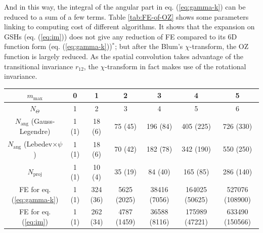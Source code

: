 And in this way, the integral of the angular part in eq. (\ref{eq:gamma-k})
can be reduced to a sum of a few terms. Table \ref{tab:FE-of-OZ}
shows some parameters linking to computing cost of different algorithms.
It
shows that the expansion on \acs{GSH}s (eq. (\ref{eq:im})) does
not give any reduction of \acs{FE} compared to its 6D function form
(eq. (\ref{eq:gamma-k}))$^{*}$; but after the Blum's $\chi$-transform,
the \acs{OZ} function is largely reduced. As the spatial convolution
takes advantage of the transitional invariance $r_{12}$, the $\chi$-transform
in fact makes use of the rotational invariance.

\begin{table}[h]
\centering{}\hspace{-4em}%
\noindent\begin{minipage}[t]{1.1\columnwidth}%
\begin{center}
\begin{tabular*}{1\textwidth}{@{\extracolsep{\fill}}ccccccc}
\toprule 
{\footnotesize{}$m_{\mathrm{max}}$} & {\footnotesize{}0} & {\footnotesize{}1} & {\footnotesize{}2} & {\footnotesize{}3} & {\footnotesize{}4} & {\footnotesize{}5}\tabularnewline
\midrule
{\footnotesize{}$N_{\Theta}$} & {\footnotesize{}1} & {\footnotesize{}2} & {\footnotesize{}3} & {\footnotesize{}4} & {\footnotesize{}5} & {\footnotesize{}6}\tabularnewline
{\footnotesize{}$N_{\mathrm{ang}}$ (Gauss-Legendre)} & {\footnotesize{}1 (1)} & {\footnotesize{}18 (6)} & {\footnotesize{}75 (45)} & {\footnotesize{}196 (84)} & {\footnotesize{}405 (225)} & {\footnotesize{}726 (330)}\tabularnewline
{\footnotesize{}$N_{\mathrm{ang}}$ (Lebedev$\times\psi$)} & {\footnotesize{}1 (1)} & {\footnotesize{}18 (6)} & {\footnotesize{}70 (42)} & {\footnotesize{}182 (78)} & {\footnotesize{}342 (190)} & {\footnotesize{}550 (250)}\tabularnewline
{\footnotesize{}$N_{\mathrm{proj}}$ } & {\footnotesize{}1 (1)} & {\footnotesize{}10 (4)} & {\footnotesize{}35 (19)} & {\footnotesize{}84 (40)} & {\footnotesize{}165 (85)} & {\footnotesize{}286 (140)}\tabularnewline
{\footnotesize{}FE for eq. (\ref{eq:gamma-k})} & {\footnotesize{}1 (1)} & {\footnotesize{}324 (36)} & {\footnotesize{}5625 (2025)} & {\footnotesize{}38416 (7056)} & {\footnotesize{}164025 (50625)} & {\footnotesize{}527076 (108900)}\tabularnewline
{\footnotesize{}FE for eq. (\ref{eq:im})} & {\footnotesize{}1 (1)} & {\footnotesize{}262 (34)} & {\footnotesize{}4787 (1459)} & {\footnotesize{}36588 (8116)} & {\footnotesize{}175989 (47221)} & {\footnotesize{}633490 (150566)}\tabularnewline

\end{tabular*}
\end{center}
\end{minipage}
\end{table}
